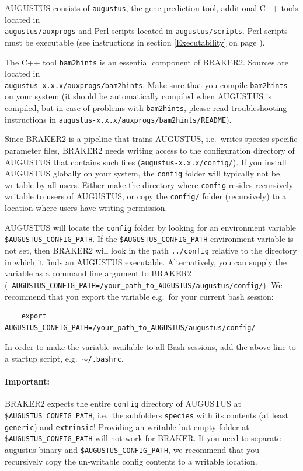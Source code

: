 \documentclass[a4paper,10pt]{report}
\begin{document}
AUGUSTUS consists of \texttt{augustus}, the gene prediction tool, additional C++ tools located in\\ \texttt{augustus/auxprogs} and Perl scripts located in \texttt{augustus/scripts}. Perl scripts must be executable (see instructions in section \ref{Executability} on page \pageref{Executability}). 
   
   The C++ tool \texttt{bam2hints} is an essential component of BRAKER2. Sources are located in \\\texttt{augustus-x.x.x/auxprogs/bam2hints}. Make sure that you compile \texttt{bam2hints} on your system (it should be automatically compiled when AUGUSTUS is compiled, but in case of problems with \texttt{bam2hints}, please read troubleshooting instructions in 
   \texttt{augustus-x.x.x/auxprogs/bam2hints/README}).
   
   Since BRAKER2 is a pipeline that trains AUGUSTUS, i.e.~writes species specific parameter files, BRAKER2 needs writing access to the configuration directory of AUGUSTUS that contains such files  (\texttt{augustus-x.x.x/config/}). If you install AUGUSTUS
   globally on your system, the \texttt{config} folder will typically not be writable by all users. Either make the directory where \texttt{config} resides recursively writable to users of AUGUSTUS, or copy the \texttt{config/} folder (recursively) to a location where users have writing permission. 
   
   AUGUSTUS will locate the \texttt{config} folder by looking for an environment variable \texttt{\$AUGUSTUS\_CONFIG\_PATH}. If the \texttt{\$AUGUSTUS\_CONFIG\_PATH} environment variable is not set, then BRAKER2 will look in 
    the path \texttt{../config} relative to the directory in which it finds an AUGUSTUS executable. Alternatively, you can supply the variable as a command line argument to BRAKER2\\ (\texttt{--AUGUSTUS\_CONFIG\_PATH=/your\_path\_to\_AUGUSTUS/augustus/config/}). We recommend that you export the variable e.g.~for your current bash session:

    \begin{verbatim}
    export AUGUSTUS_CONFIG_PATH=/your_path_to_AUGUSTUS/augustus/config/
    \end{verbatim}

In order to make the variable available to all Bash sessions, add the above line to a startup script, e.g.~\texttt{$\sim$/.bashrc}.

\paragraph{Important: } BRAKER2 expects the entire \texttt{config} directory of AUGUSTUS at \texttt{\$AUGUSTUS\_CONFIG\_PATH}, i.e.~the subfolders \texttt{species} with its contents (at least \texttt{generic}) and \texttt{extrinsic}! Providing an writable but empty folder at \texttt{\$AUGUSTUS\_CONFIG\_PATH} will not work for BRAKER. If you need to separate augustus binary and \texttt{\$AUGUSTUS\_CONFIG\_PATH}, we recommend that you recursively copy the un-writable config contents to a writable location.
\end{document}
